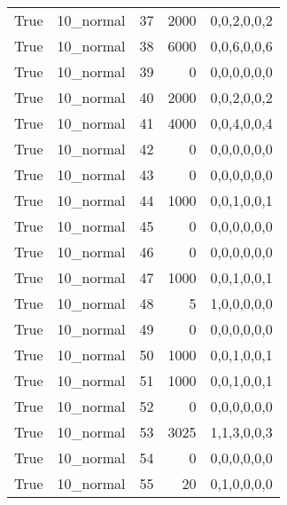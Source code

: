 \begin{tabular}{llrrl}
 True            & 10\_normal           &            37 &                  2000 & 0,0,2,0,0,2   \\
 True            & 10\_normal           &            38 &                  6000 & 0,0,6,0,0,6   \\
 True            & 10\_normal           &            39 &                     0 & 0,0,0,0,0,0   \\
 True            & 10\_normal           &            40 &                  2000 & 0,0,2,0,0,2   \\
 True            & 10\_normal           &            41 &                  4000 & 0,0,4,0,0,4   \\
 True            & 10\_normal           &            42 &                     0 & 0,0,0,0,0,0   \\
 True            & 10\_normal           &            43 &                     0 & 0,0,0,0,0,0   \\
 True            & 10\_normal           &            44 &                  1000 & 0,0,1,0,0,1   \\
 True            & 10\_normal           &            45 &                     0 & 0,0,0,0,0,0   \\
 True            & 10\_normal           &            46 &                     0 & 0,0,0,0,0,0   \\
 True            & 10\_normal           &            47 &                  1000 & 0,0,1,0,0,1   \\
 True            & 10\_normal           &            48 &                     5 & 1,0,0,0,0,0   \\
 True            & 10\_normal           &            49 &                     0 & 0,0,0,0,0,0   \\
 True            & 10\_normal           &            50 &                  1000 & 0,0,1,0,0,1   \\
 True            & 10\_normal           &            51 &                  1000 & 0,0,1,0,0,1   \\
 True            & 10\_normal           &            52 &                     0 & 0,0,0,0,0,0   \\
 True            & 10\_normal           &            53 &                  3025 & 1,1,3,0,0,3   \\
 True            & 10\_normal           &            54 &                     0 & 0,0,0,0,0,0   \\
 True            & 10\_normal           &            55 &                    20 & 0,1,0,0,0,0   \\

\end{tabular}
